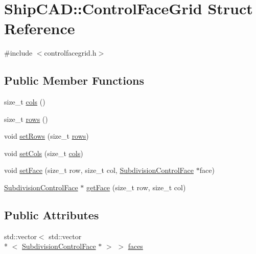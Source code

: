 \hypertarget{structShipCAD_1_1ControlFaceGrid}{\section{Ship\-C\-A\-D\-:\-:Control\-Face\-Grid Struct Reference}
\label{structShipCAD_1_1ControlFaceGrid}
}


{\ttfamily \#include $<$controlfacegrid.\-h$>$}

\subsection*{Public Member Functions}
\begin{DoxyCompactItemize}
\item 
size\-\_\-t \hyperlink{structShipCAD_1_1ControlFaceGrid_ab7a808def28fd23029532f1bce5bb674}{cols} ()
\item 
size\-\_\-t \hyperlink{structShipCAD_1_1ControlFaceGrid_a8b124d162ea1d32383f4896e29811c12}{rows} ()
\item 
void \hyperlink{structShipCAD_1_1ControlFaceGrid_a5022cc08e6d00215fff8583518098d4e}{set\-Rows} (size\-\_\-t \hyperlink{structShipCAD_1_1ControlFaceGrid_a8b124d162ea1d32383f4896e29811c12}{rows})
\item 
void \hyperlink{structShipCAD_1_1ControlFaceGrid_ad2d6840064503024af3af888b1e315e8}{set\-Cols} (size\-\_\-t \hyperlink{structShipCAD_1_1ControlFaceGrid_ab7a808def28fd23029532f1bce5bb674}{cols})
\item 
void \hyperlink{structShipCAD_1_1ControlFaceGrid_a07c8ccb4bc08c0561aedbbbe0b1322ef}{set\-Face} (size\-\_\-t row, size\-\_\-t col, \hyperlink{classShipCAD_1_1SubdivisionControlFace}{Subdivision\-Control\-Face} $\ast$face)
\item 
\hyperlink{classShipCAD_1_1SubdivisionControlFace}{Subdivision\-Control\-Face} $\ast$ \hyperlink{structShipCAD_1_1ControlFaceGrid_ae77d2fb91a62c9631c66786a905d256d}{get\-Face} (size\-\_\-t row, size\-\_\-t col)
\end{DoxyCompactItemize}
\subsection*{Public Attributes}
\begin{DoxyCompactItemize}
\item 
std\-::vector$<$ std\-::vector\\*
$<$ \hyperlink{classShipCAD_1_1SubdivisionControlFace}{Subdivision\-Control\-Face} $\ast$ $>$ $>$ \hyperlink{structShipCAD_1_1ControlFaceGrid_aa040d7465260af92995eff9ef7623984}{faces}
\end{DoxyCompactItemize}


